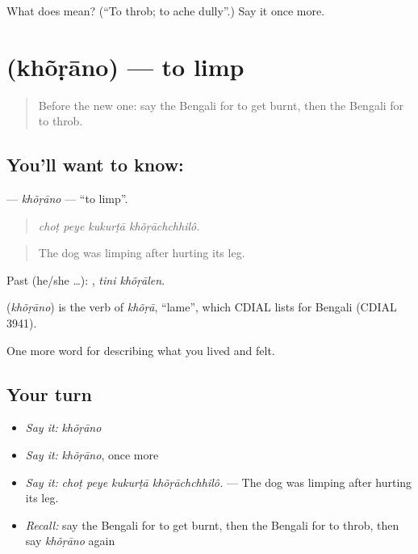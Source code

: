 \begin{tcolorbox}[breakable,colback=teal!4,colframe=teal!35!black,title={Before you move on}]
What does   mean? (\textquotedblleft{}To throb; to ache dully\textquotedblright{}.) Say it once more.
\end{tcolorbox}
\section[\texorpdfstring{\bn{খোঁড়ানো} (khõṛāno)}{খোঁড়ানো (khõṛāno)}]{ (khõṛāno) — to limp}

\label{lesson:BN-C477-khorano}



\begin{quote}
Before the new one: say the Bengali for to get burnt, then the Bengali for to throb.
\end{quote}

\subsection*{You'll want to know: }
\textbf{} — \emph{khõṛāno} — \textquotedblleft{}to limp\textquotedblright{}.

\begin{quote}
   
\end{quote}

\begin{quote}
\emph{choṭ peye kukurṭā khõṛāchchhilô.}
\end{quote}

\begin{quote}
The dog was limping after hurting its leg.
\end{quote}

Past (he/she …):  , \emph{tini khõṛālen}.

\begin{cousinweb}
\textbf{} (\emph{khõṛāno}) is the verb of \emph{khõṛā}, \textquotedblleft{}lame\textquotedblright{}, which CDIAL lists for Bengali (CDIAL 3941).
\end{cousinweb}

\begin{grammarlens}[title={What you've built}]
One more word for describing what you lived and felt.
\end{grammarlens}

\subsection*{Your turn}
\begin{itemize}
\raggedright
  \item \emph{Say it:} \emph{khõṛāno}
  \item \emph{Say it:} \emph{khõṛāno}, once more
  \item \emph{Say it:} \emph{choṭ peye kukurṭā khõṛāchchhilô.} — The dog was limping after hurting its leg.
  \item \emph{Recall:} say the Bengali for to get burnt, then the Bengali for to throb, then say \emph{khõṛāno} again
\end{itemize}

